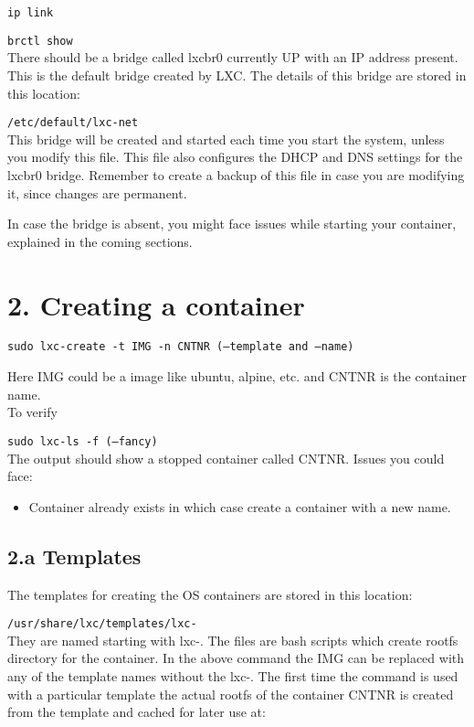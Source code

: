 \documentclass{report}
\begin{document}
\texttt{ip link}

\texttt{brctl show} \\
There should be a bridge called lxcbr0 currently UP with an IP address present. This is the default bridge created by LXC. The details of this bridge are stored in this location:

\texttt{/etc/default/lxc-net} \\
This bridge will be created and started each time you start the system, unless you modify this file. This file also configures the DHCP and DNS settings for the lxcbr0 bridge. Remember to create a backup of this file in case you are modifying it, since changes are permanent.

In case the bridge is absent, you might face issues while starting your container, explained in the coming sections.

\section*{2. Creating a container}

\texttt{sudo lxc-create {-t IMG} {-n CNTNR} (--template and --name)}
	
Here IMG could be a image like ubuntu, alpine, etc. and CNTNR is the container name. \\
To verify 

\texttt{sudo lxc-ls -f (--fancy)} \\		
The output should show a stopped container called CNTNR.
Issues you could face:	
\begin{itemize}
\item Container already exists in which case create a container with a new name.
\end{itemize}
\subsection*{2.a Templates}
	
The templates for creating the OS containers are stored in this location: 

\texttt{/usr/share/lxc/templates/lxc-} \\
They are named starting with lxc-. The files are bash scripts which create rootfs directory for the container. In the above command the IMG can be replaced with any of the template names without the lxc-. The first time the command is used with a particular template the actual rootfs of the container CNTNR is created from the template and cached for later use at: 
\end{document}
